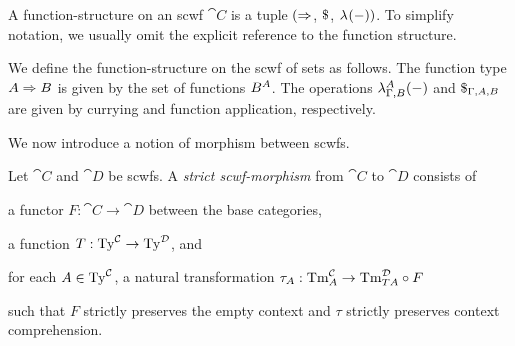 A function-structure on an scwf $\cat{C}$ is a tuple $(\Sfuncty{}{}$, $\Sapp{}{}$, $\Slam{}{-})$. To simplify notation, we usually omit the explicit reference to the function structure.

\begin{ex}
We define the function-structure on the scwf of sets as follows. The function type $\Sfuncty{A}{B}$ is given by the set of functions $\funcset{A}{B}$. The operations $\Slam{A}[\Gamma, B]{-}$ and $\Sapp[\Gamma,A,B]{}{}$ are given by currying and function application, respectively.
\end{ex}

We now introduce a notion of morphism between scwfs.

\begin{defn} \label{def:strict-scwf-morphism}
Let $\cat{C}$ and $\cat{D}$ be scwfs. A \emph{strict scwf-morphism} from $\cat{C}$ to $\cat{D}$ consists of
\begin{enum}
    \item a functor $F : \cat{C} \to \cat{D}$ between the base categories,
    \item a function $T : \STy[\cat{C}] \to \STy[\cat{D}]$, and
    \item for each $A \in \STy[\cat{C}]$, a natural transformation $\tau_A : \STm{A}[\cat{C}] \to \STm{TA}[\cat{D}] \circ F$
\end{enum}
such that $F$ strictly preserves the empty context and $\tau$ strictly preserves context comprehension.
\end{defn}

